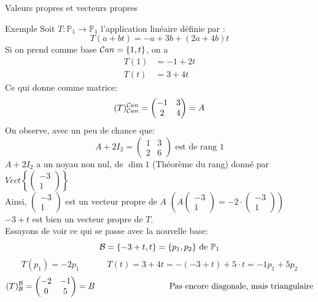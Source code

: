 \begin{parag}{Valeurs propres et vecteurs propres}
    \begin{subparag}{Exemple}
        Soit $T : \mathbb{P}_1 \to \mathbb{P}_1$ l'application linéaire définie par : 
        \[T(a + bt) = -a + 3b + (2a + 4b)t\]
        Si on prend comme base $\mathcal{C} an = \{1, t\}$, on a
        \begin{align*}
            T(1) &= -1 + 2t\\
            T(t) &= 3 + 4t
        \end{align*}
        Ce qui donne comme matrice:
        \[(T)_{\mathcal{C} an}^{\mathcal{C} an} = \begin{pmatrix}
            -1  & 3 \\ 2 &  4
        \end{pmatrix} = A\]
        On observe, avec un peu de chance que:
        \[A + 2I_2 = \begin{pmatrix}
            1 & 3 \\ 2 & 6
        \end{pmatrix} \text{ est de rang }1\]
        $A + 2I_2$ a un noyau non nul, de $\dim 1$ (Théorème du rang) donné par $Vect\left\{ \begin{pmatrix}
            -3 \\ 1
        \end{pmatrix}\right\}$\\
        Ainsi, $\begin{pmatrix}
            -3 \\ 1
        \end{pmatrix}$ est un vecteur propre de $A$ $\left(A\begin{pmatrix}
            -3 \\ 1
        \end{pmatrix} = -2 \cdot\begin{pmatrix}
            -3 \\ 1
        \end{pmatrix}\right)$\\
        $-3 + t$ est bien un vecteur propre de $T$.\\
        Essayons de voir ce qui se passe avec la nouvelle base:
        \[\mathcal{B} = \{-3 + t, t\} = \{p_1, p_2\} \text{ de } \mathbb{P}_1\]
        \[T(p_1)= -2p_1 \; \; \; \hspace{1cm} T(t) = 3 + 4t = -(-3 + t) + 5\cdot t = -1 p_1 + 5p_2\]
        \[(T)_\bmath^\bmath = \begin{pmatrix}
            -2 & -1 \\ 0 & 5
        \end{pmatrix} = B \hspace{3cm} \text{ Pas encore diagonale, mais triangulaire}\]

\end{subparag}
\end{parag}
